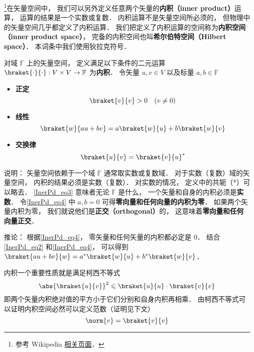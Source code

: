 

\footnote{参考 Wikipedia \href{https://en.wikipedia.org/wiki/Inner_product_space}{相关页面}．}在矢量空间中， 我们可以另外定义任意两个矢量的\textbf{内积（inner product）}运算， 运算的结果是一个实数或复数． 内积运算不是矢量空间所必须的， 但物理中的矢量空间几乎都定义了内积运算． 我们把定义了内积运算的空间称为\textbf{内积空间（inner product space）}， 完备的内积空间也叫\textbf{希尔伯特空间（Hilbert space）}． 本词条中我们使用狄拉克符号．

\begin{definition}{}
对域 $\mathbb F$ 上的矢量空间， 定义满足以下条件的二元运算 $\braket{\cdot}{\cdot}: V\times V\to \mathbb F$ 为\textbf{内积}． 令矢量 $u, v\in V$ 以及标量 $a, b \in \mathbb F$
\begin{itemize}
\item \textbf{正定}
\begin{equation}\label{InerPd_eq3}
\braket{v}{v} > 0 \quad (v \ne 0)
\end{equation}
\item \textbf{线性}
\begin{equation}\label{InerPd_eq4}
\braket{w}{a u + b v} = a\braket{w}{u} + b\braket{w}{v}
\end{equation}
\item \textbf{交换律}
\begin{equation}\label{InerPd_eq2}
\braket{u}{v} = \braket{v}{u}^*
\end{equation}
\end{itemize}
\end{definition}
说明： 矢量空间依赖于一个域 $\mathbb F$ 通常取实数或复数域． 对于实数（复数）域的矢量空间， 内积的结果必须是实数（复数）． 对实数的情况， 定义中的共轭（*）可以略去． \autoref{InerPd_eq3} 意味者无论 $\mathbb F$ 是什么， 一个矢量和自身的内积必须是\textbf{实数}． 令\autoref{InerPd_eq4} 中 $a,b= 0$ 可得\textbf{零向量和任何向量的内积为零}． 如果两个矢量内积为零， 我们就说他们是\textbf{正交（orthogonal）}的， 这意味着\textbf{零向量和任何向量正交}．

推论： 根据\autoref{InerPd_eq4}， 零矢量和任何矢量的内积都必定是 0． 结合\autoref{InerPd_eq2} 和\autoref{InerPd_eq4}， 可以得到 $\braket{a u + b v}{w} = a^*\braket{w}{u} + b^*\braket{w}{v}$．

内积一个重要性质就是满足柯西不等式
\begin{equation}
\abs{\braket{u}{v}}^2 \leqslant \braket{u}{u} \cdot \braket{v}{v}
\end{equation}
即两个矢量内积绝对值的平方小于它们分别和自身内积再相乘． 由柯西不等式可以证明内积空间必然可以定义范数（证明见下文）
\begin{equation}
\norm{v} = \braket{v}{v}
\end{equation}

